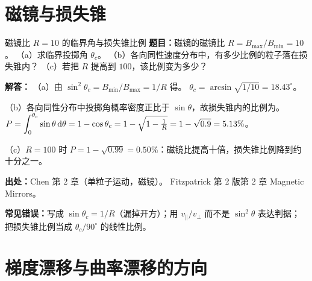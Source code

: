 \section{磁镜与损失锥}

\begin{example}{磁镜比 $R=10$ 的临界角与损失锥比例}{}
\textbf{题目：}磁镜的磁镜比 $R=B_{\max}/B_{\min}=10$。
（a）求临界投掷角 $\theta_c$。
（b）各向同性速度分布中，有多少比例的粒子落在损失锥内？
（c）若把 $R$ 提高到 $100$，该比例变为多少？

\textbf{解答：}
（a）由 $\sin^2\theta_c=B_{\min}/B_{\max}=1/R$ 得。
$\theta_c=\arcsin\sqrt{1/10}=18.43^\circ$。

（b）各向同性分布中投掷角概率密度正比于 $\sin\theta$，故损失锥内的比例为。
$P=\displaystyle\int_0^{\theta_c}\sin\theta\,\mathrm{d}\theta=1-\cos\theta_c
=1-\sqrt{1-\tfrac1R}=1-\sqrt{0.9}=5.13\%$。

（c）$R=100$ 时 $P=1-\sqrt{0.99}=0.50\%$：磁镜比提高十倍，损失锥比例降到约十分之一。

{\footnotesize
\textbf{出处：}Chen 第 2 章（单粒子运动，磁镜）。
Fitzpatrick 第 2 版第 2 章 Magnetic Mirrors。
}

\textbf{常见错误：}写成 $\sin\theta_c=1/R$（漏掉开方）；用 $v_\parallel/v_\perp$ 而不是 $\sin^2\theta$ 表达判据；把损失锥比例当成 $\theta_c/90^\circ$ 的线性比例。
\end{example}


\section{梯度漂移与曲率漂移的方向}

